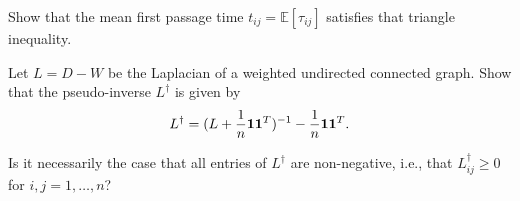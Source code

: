 \begin{myexercise}
Show that the mean first passage time $t_{ij} = \mathbb{E}[\tau_{ij}]$ satisfies that triangle inequality.
\end{myexercise} 

\begin{myexercise}
Let $L = D - W$ be the Laplacian of a weighted undirected connected graph. Show that the pseudo-inverse $L^\dagger$ is given by
$$L^\dagger = (L + \frac{1}{n}{\textbf 1}{\textbf 1}^T)^{-1} - \frac{1}{n} {\textbf 1}{\textbf 1}^T.$$
\end{myexercise} 

\begin{myexercise}
Is it necessarily the case that all entries of $L^\dagger$ are non-negative, i.e., that $L^\dagger_{ij} \geq 0$ for $i,j=1,\ldots,n$? 
\end{myexercise}


